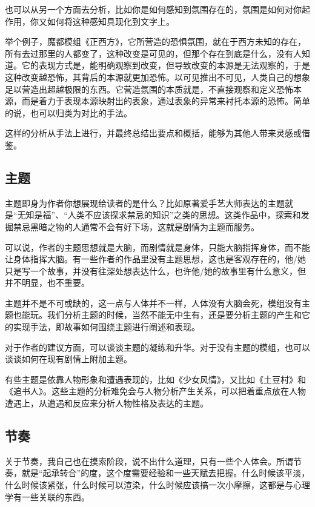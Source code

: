\documentclass[a4paper,zihao=-4,notitlepage,twoside,openright]{ctexart}
\begin{document}
也可以从另一个方面去分析，比如你是如何感知到氛围存在的，氛围是如何对你起作用，你又如何将这种感知具现化到文字上。

举个例子，魔都模组《正西方》，它所营造的恐惧氛围，就在于西方未知的存在，所有去过那里的人都变了，这种改变是可见的，但那个存在到底是什么，没有人知道。它的表现方式是，能明确观察到改变，但导致改变的本源是无法观察的，于是这种改变越恐怖，其背后的本源就更加恐怖。以可见推出不可见，人类自己的想象足以营造出超越极限的东西。它营造氛围的本质就是，不直接观察和定义恐怖本源，而是着力于表现本源映射出的表象，通过表象的异常来衬托本源的恐怖。简单的说，也可以归类为对比的手法。

这样的分析从手法上进行，并最终总结出要点和概括，能够为其他人带来灵感或借鉴。

\subsection{主题}

主题即身为作者你想展现给读者的是什么？比如原著爱手艺大师表达的主题就是“无知是福”、“人类不应该探求禁忌的知识”之类的思想。这类作品中，探索和发掘禁忌黑暗之物的人通常不会有好下场，这就是剧情为主题而服务。

可以说，作者的主题思想就是大脑，而剧情就是身体，只能大脑指挥身体，而不能让身体指挥大脑。有一些作者的作品里没有主题思想，这也是客观存在的，他/她只是写一个故事，并没有往深处想表达什么，也许他/她的故事里有什么意义，但并不明显，也不重要。

主题并不是不可或缺的，这一点与人体并不一样，人体没有大脑会死，模组没有主题也能玩。我们分析主题的时候，当然不能无中生有，还是要分析主题的产生和它的实现手法，即故事如何围绕主题进行阐述和表现。

对于作者的建议方面，可以谈谈主题的凝练和升华。对于没有主题的模组，也可以谈谈如何在现有剧情上附加主题。

有些主题是依靠人物形象和遭遇表现的，比如《少女风情》，又比如《土豆村》和《追书人》。这些主题的分析难免会与人物分析产生关系，可以把着重点放在人物遭遇上，从遭遇和反应来分析人物性格及表达的主题。

\subsection{节奏}

关于节奏，我自己也在摸索阶段，说不出什么道理，只有一些个人体会。所谓节奏，就是“起承转合”的度，这个度需要经验和一些天赋去把握。什么时候该平淡，什么时候该紧张，什么时候可以渲染，什么时候应该搞一次小摩擦，这都是与心理学有一些关联的东西。
\end{document}
